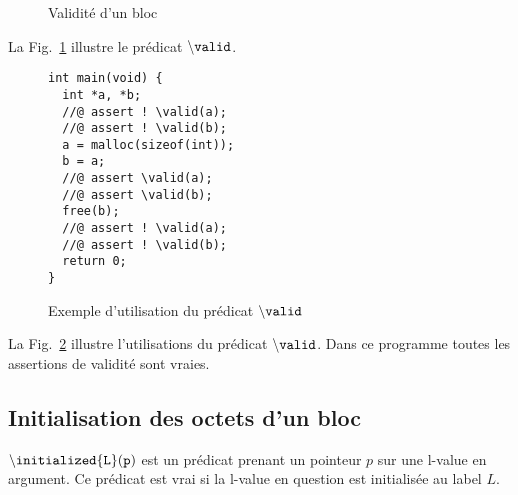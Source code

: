 \begin{figure}[h]
  \begin{center}
  \end{center}
  \caption{Validité d'un bloc}
  \label{fig:valid}
\end{figure}

La Fig.~\ref{fig:valid} illustre le prédicat ${\tt \backslash valid}$.

\begin{figure}[h]
\begin{lstlisting}
int main(void) {
  int *a, *b;
  //@ assert ! \valid(a);
  //@ assert ! \valid(b);
  a = malloc(sizeof(int));
  b = a;
  //@ assert \valid(a);
  //@ assert \valid(b);
  free(b);
  //@ assert ! \valid(a);
  //@ assert ! \valid(b);
  return 0;
}
\end{lstlisting}
\caption{Exemple d'utilisation du prédicat ${\tt \backslash valid}$}
\label{fig:valid-example}
\end{figure}

La Fig.~\ref{fig:valid-example} illustre l'utilisations du prédicat
${\tt \backslash valid}$. Dans ce programme toutes les assertions de validité
sont vraies.


\subsection{Initialisation des octets d'un bloc}

${\tt \backslash initialized\{L\}(p)}$ est un prédicat prenant un pointeur $p$
sur une l-value en argument. Ce prédicat est vrai si la l-value en question est
initialisée au label $L$.



